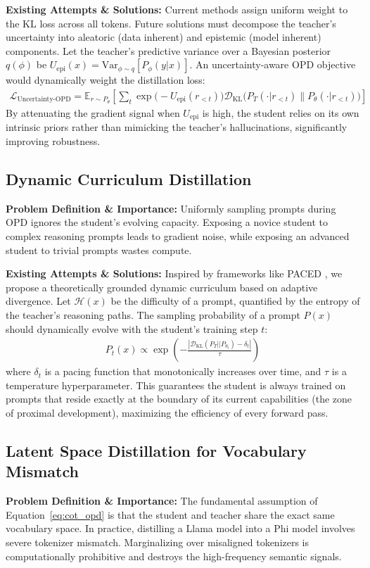 \textbf{Existing Attempts \& Solutions:} Current methods assign uniform weight to the KL loss across all tokens. Future solutions must decompose the teacher's uncertainty into aleatoric (data inherent) and epistemic (model inherent) components. Let the teacher's predictive variance over a Bayesian posterior $q(\phi)$ be $U_{\text{epi}}(x) = \text{Var}_{\phi \sim q}[P_\phi(y|x)]$. An uncertainty-aware OPD objective would dynamically weight the distillation loss:
\begin{align}
\mathcal{L}_{\text{Uncertainty-OPD}} = \mathbb{E}_{r \sim P_\theta} \left[ \sum_t \exp\big(-U_{\text{epi}}(r_{<t})\big) \mathcal{D}_{\text{KL}}\Big(P_T(\cdot | r_{<t}) \parallel P_\theta(\cdot | r_{<t})\Big) \right]
\end{align}
By attenuating the gradient signal when $U_{\text{epi}}$ is high, the student relies on its own intrinsic priors rather than mimicking the teacher's hallucinations, significantly improving robustness.

\subsection{Dynamic Curriculum Distillation}
\textbf{Problem Definition \& Importance:} Uniformly sampling prompts during OPD ignores the student's evolving capacity. Exposing a novice student to complex reasoning prompts leads to gradient noise, while exposing an advanced student to trivial prompts wastes compute. 

\textbf{Existing Attempts \& Solutions:} Inspired by frameworks like PACED \citep{2603.11178}, we propose a theoretically grounded dynamic curriculum based on adaptive divergence. Let $\mathcal{H}(x)$ be the difficulty of a prompt, quantified by the entropy of the teacher's reasoning paths. The sampling probability of a prompt $P(x)$ should dynamically evolve with the student's training step $t$:
\begin{align}
P_t(x) \propto \exp\left( -\frac{| \mathcal{D}_{\text{KL}}(P_T || P_{\theta_t}) - \delta_t |}{\tau} \right)
\end{align}
where $\delta_t$ is a pacing function that monotonically increases over time, and $\tau$ is a temperature hyperparameter. This guarantees the student is always trained on prompts that reside exactly at the boundary of its current capabilities (the zone of proximal development), maximizing the efficiency of every forward pass.

\subsection{Latent Space Distillation for Vocabulary Mismatch}
\textbf{Problem Definition \& Importance:} The fundamental assumption of Equation~\ref{eq:cot_opd} is that the student and teacher share the exact same vocabulary space. In practice, distilling a Llama model into a Phi model involves severe tokenizer mismatch. Marginalizing over misaligned tokenizers is computationally prohibitive and destroys the high-frequency semantic signals.

